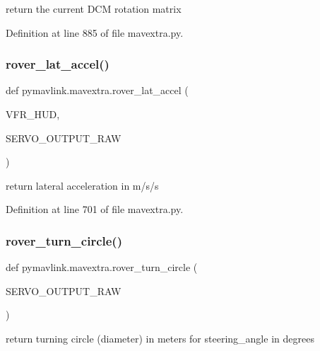 \begin{DoxyVerb}return the current DCM rotation matrix\end{DoxyVerb}
 

Definition at line 885 of file mavextra.\+py.

\mbox{\label{namespacepymavlink_1_1mavextra_a55bf23fb8b11c2e546dddb4eab80eae0}} 
\subsubsection{\texorpdfstring{rover\_lat\_accel()}{rover\_lat\_accel()}}
{\footnotesize\ttfamily def pymavlink.\+mavextra.\+rover\+\_\+lat\+\_\+accel (\begin{DoxyParamCaption}\item[{}]{V\+F\+R\+\_\+\+H\+UD,  }\item[{}]{S\+E\+R\+V\+O\+\_\+\+O\+U\+T\+P\+U\+T\+\_\+\+R\+AW }\end{DoxyParamCaption})}

\begin{DoxyVerb}return lateral acceleration in m/s/s\end{DoxyVerb}
 

Definition at line 701 of file mavextra.\+py.

\mbox{\label{namespacepymavlink_1_1mavextra_a2cf4432c48b582f8471874e3ae33de17}} 
\subsubsection{\texorpdfstring{rover\_turn\_circle()}{rover\_turn\_circle()}}
{\footnotesize\ttfamily def pymavlink.\+mavextra.\+rover\+\_\+turn\+\_\+circle (\begin{DoxyParamCaption}\item[{}]{S\+E\+R\+V\+O\+\_\+\+O\+U\+T\+P\+U\+T\+\_\+\+R\+AW }\end{DoxyParamCaption})}

\begin{DoxyVerb}return turning circle (diameter) in meters for steering_angle in degrees
\end{DoxyVerb}
 

